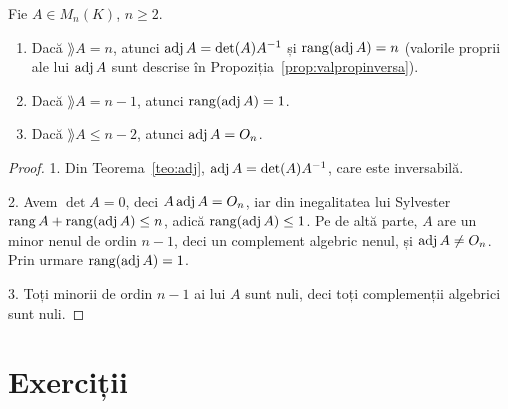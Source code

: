 \begin{lema}\label{lema:rangadj}
Fie $A\in M_n(K)$, $n\ge2$.
\begin{enumerate}
    \item Dacă $\rang A=n$, atunci $\operatorname{adj} A=\det(A)A^{-1}$ și $\operatorname{rang}(\operatorname{adj} A)=n$ (valorile proprii ale lui $\operatorname{adj} A$ sunt descrise în Propoziția~\ref{prop:valpropinversa}).
    \item Dacă $\rang A=n-1$, atunci $\operatorname{rang}(\operatorname{adj} A)=1$.
    \item Dacă $\rang A\le n-2$, atunci $\operatorname{adj} A=O_n$.
\end{enumerate}
\end{lema}

\begin{proof}
1. Din Teorema~\ref{teo:adj}, $\operatorname{adj} A=\det(A)A^{-1}$, care este inversabilă.

2. Avem $\det A=0$, deci $A\operatorname{adj} A=O_n$, iar din inegalitatea lui Sylvester $\operatorname{rang} A+\operatorname{rang}(\operatorname{adj} A)\le n$, adică $\operatorname{rang}(\operatorname{adj} A)\le1$. Pe de altă parte, $A$ are un minor nenul de ordin $n-1$, deci un complement algebric nenul, și $\operatorname{adj} A\neq O_n$. Prin urmare $\operatorname{rang}(\operatorname{adj} A)=1$.

3. Toți minorii de ordin $n-1$ ai lui $A$ sunt nuli, deci toți complemenții algebrici sunt nuli.
\end{proof}

\section{Exerciții}

